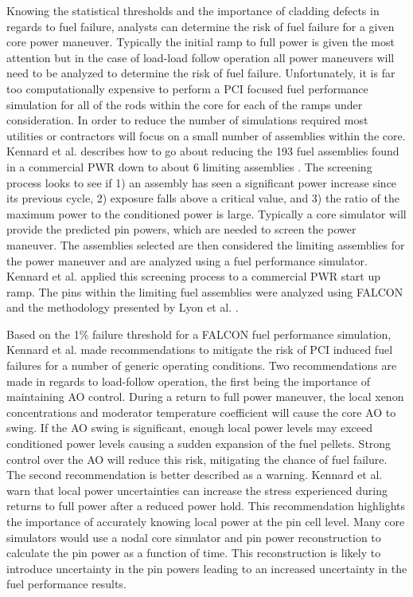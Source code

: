 \documentclass[edeposit,fullpage,11pt]{uiucthesis2009}
\begin{document}
Knowing the statistical thresholds and the importance of cladding defects in regards to fuel failure, analysts can determine the risk of fuel failure for a given core power maneuver.
Typically the initial ramp to full power is given the most attention but in the case of load-load follow operation all power maneuvers will need to be analyzed to determine the risk of fuel failure.
Unfortunately, it is far too computationally expensive to perform a \gls{PCI} focused fuel performance simulation for all of the rods within the core for each of the ramps under consideration.
In order to reduce the number of simulations required most utilities or contractors will focus on a small number of assemblies within the core.
Kennard et al. describes how to go about reducing the 193 fuel assemblies found in a commercial \gls{PWR} down to about 6 limiting assemblies \cite{kennard_pci_2016}.
The screening process  looks to see if 1) an assembly has seen a significant power increase since its previous cycle, 2) exposure falls above a critical value, and 3) the ratio of the maximum power to the conditioned power is large.
Typically a core simulator will provide the predicted pin powers, which are needed to screen the power maneuver.
The assemblies selected are then considered the limiting assemblies for the power maneuver and are analyzed using a fuel performance simulator.
Kennard et al. applied this screening process to a commercial \gls{PWR} start up ramp.
The pins within the limiting fuel assemblies were analyzed using FALCON and the methodology presented by Lyon et al. \cite{lyon_pci_2009}.

Based on the 1\% failure threshold for a FALCON fuel performance simulation, Kennard et al. made recommendations to mitigate the risk of \gls{PCI} induced fuel failures for a number of generic operating conditions.
Two recommendations are made in regards to load-follow operation, the first being the importance of maintaining \gls{AO} control.
During a return to full power maneuver, the local xenon concentrations and moderator temperature coefficient will cause the core \gls{AO} to swing.
If the \gls{AO} swing is significant, enough local power levels may exceed conditioned power levels causing a sudden expansion of the fuel pellets.
Strong control over the \gls{AO} will reduce this risk, mitigating the chance of fuel failure.
The second recommendation is better described as a warning.
Kennard et al. warn that local power uncertainties can increase the stress experienced during returns to full power after a reduced power hold.
This recommendation highlights the importance of accurately knowing local power at the pin cell level.
Many core simulators would use a nodal core simulator and pin power reconstruction to calculate the pin power as a function of time.
This reconstruction is likely to introduce uncertainty in the pin powers leading to an increased uncertainty in the fuel performance results.
\end{document}
